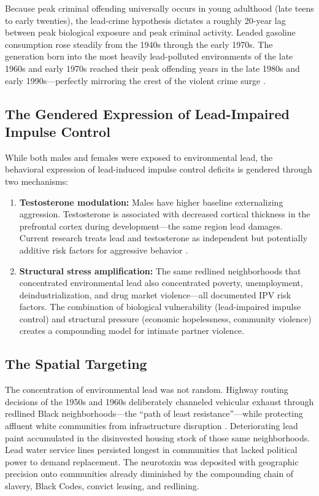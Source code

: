\documentclass[12pt, letterpaper]{article}
\begin{document}
Because peak criminal offending universally occurs in young adulthood (late teens to early twenties), the lead-crime hypothesis dictates a roughly 20-year lag between peak biological exposure and peak criminal activity. Leaded gasoline consumption rose steadily from the 1940s through the early 1970s. The generation born into the most heavily lead-polluted environments of the late 1960s and early 1970s reached their peak offending years in the late 1980s and early 1990s---perfectly mirroring the crest of the violent crime surge \citep{nevin2007}.

\subsection{The Gendered Expression of Lead-Impaired Impulse Control}

While both males and females were exposed to environmental lead, the behavioral expression of lead-induced impulse control deficits is gendered through two mechanisms:

\begin{enumerate}
    \item \textbf{Testosterone modulation:} Males have higher baseline externalizing aggression. Testosterone is associated with decreased cortical thickness in the prefrontal cortex during development---the same region lead damages. Current research treats lead and testosterone as independent but potentially additive risk factors for aggressive behavior \citep{frontiers2018}.

    \item \textbf{Structural stress amplification:} The same redlined neighborhoods that concentrated environmental lead also concentrated poverty, unemployment, deindustrialization, and drug market violence---all documented IPV risk factors. The combination of biological vulnerability (lead-impaired impulse control) and structural pressure (economic hopelessness, community violence) creates a compounding model for intimate partner violence.
\end{enumerate}

\subsection{The Spatial Targeting}

The concentration of environmental lead was not random. Highway routing decisions of the 1950s and 1960s deliberately channeled vehicular exhaust through redlined Black neighborhoods---the ``path of least resistance''---while protecting affluent white communities from infrastructure disruption \citep{harper2026}. Deteriorating lead paint accumulated in the disinvested housing stock of those same neighborhoods. Lead water service lines persisted longest in communities that lacked political power to demand replacement. The neurotoxin was deposited with geographic precision onto communities already diminished by the compounding chain of slavery, Black Codes, convict leasing, and redlining.
\end{document}
